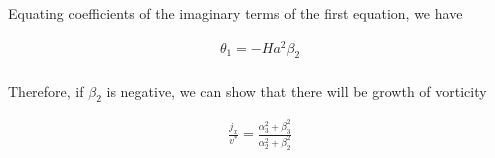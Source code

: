 \documentclass[11pt]{article}
\begin{document}
Equating coefficients of the imaginary terms of the first equation, we have

\begin{equation}\begin{aligned}
\theta_1 = - Ha^2 \beta_2 \\
\end{aligned}\end{equation}

Therefore, if $\beta_2$ is negative, we can show that there will be growth of vorticity

\begin{equation}\begin{aligned}
\frac{j_x}{v^*} = \frac{\alpha_3^2 + \beta_3^2}{\alpha_2^2 + \beta_2^2} \\
\end{aligned}\end{equation}
\end{document}
